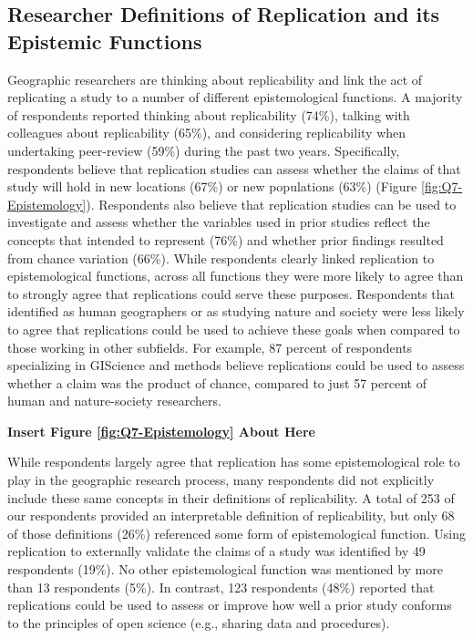 \documentclass[]{interact}
\theoremstyle{plain}%
\theoremstyle{definition}
\theoremstyle{remark}
\begin{document}
\subsection*{Researcher Definitions of Replication and its Epistemic Functions}
Geographic researchers are thinking about replicability and link the act of replicating a study to a number of different epistemological functions. 
A majority of respondents reported thinking about replicability (74\%), talking with colleagues about replicability (65\%), and considering replicability when undertaking peer-review (59\%) during the past two years. 
Specifically, respondents believe that replication studies can assess whether the claims of that study will hold in new locations (67\%) or new populations (63\%) (Figure \ref{fig:Q7-Epistemology}).
Respondents also believe that replication studies can be used to investigate and assess whether the variables used in prior studies reflect the concepts that intended to represent (76\%) and whether prior findings resulted from chance variation (66\%).
While respondents clearly linked replication to epistemological functions, across all functions they were more likely to agree than to strongly agree that replications could serve these purposes.
Respondents that identified as human geographers or as studying nature and society were less likely to agree that replications could be used to achieve these goals when compared to those working in other subfields. 
For example, 87 percent of respondents specializing in GIScience and methods believe replications could be used to assess whether a claim was the product of chance, compared to just 57 percent of human and nature-society researchers.

\begin{center}
\textbf{Insert Figure \ref{fig:Q7-Epistemology} About Here}
\end{center}

While respondents largely agree that replication has some epistemological role to play in the geographic research process, many respondents did not explicitly include these same concepts in their definitions of replicability.
A total of 253 of our respondents provided an interpretable definition of replicability, but only 68 of those definitions (26\%) referenced some form of epistemological function. 
Using replication to externally validate the claims of a study was identified by 49 respondents (19\%).
No other epistemological function was mentioned by more than 13 respondents (5\%).  
In contrast, 123 respondents (48\%) reported that replications could be used to assess or improve how well a prior study conforms to the principles of open science (e.g., sharing data and procedures).
\end{document}
